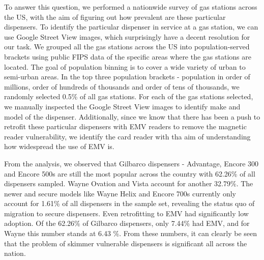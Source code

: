 To answer this question, we performed a nationwide survey of gas stations across the US, with the aim of figuring out how prevalent are these particular dispensers. To identify the particular dispenser in service at a gas station, we can use Google Street View images, which surprisingly have a decent resolution for our task. We grouped all the gas stations across the US into population-served brackets using public FIPS data of the specific areas where the gas stations are located. The goal of population binning is to cover a wide variety of urban to semi-urban areas. In the top three population brackets - population in order of millions, order of hundreds of thousands and
order of tens of thousands, we randomly selected 0.5\% of all gas stations. For each of the gas stations selected, we manually inspected the Google Street View images to identify make and model of the dispenser. Additionally, since we know that there has been a push to retrofit these particular dispensers with EMV readers to remove the magnetic reader vulnerability, we identify the card reader with tha aim of understanding how widespread the use of EMV is. 

From the analysis, we observed that Gilbarco dispensers - Advantage, Encore 300 and Encore 500s are still the most popular across the country with 62.26\% of all dispensers sampled. Wayne Ovation and Vista account for another 32.79\%. The newer and secure models like Wayne Helix and Encore 700s currently only account for 1.61\% of all dispensers in the sample set, revealing the status quo of migration to secure dispensers. Even retrofitting to EMV had significantly low adoption. Of the 62.26\% of Gilbarco dispensers, only 7.44\% had EMV, and for Wayne this number stands at 6.43 \%. From these numbers, it can clearly be seen that the problem of skimmer vulnerable dispensers is significant all across the nation.

